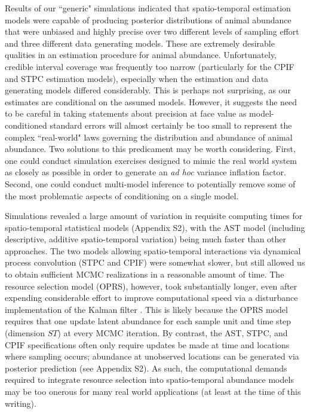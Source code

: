 \documentclass[times,mee,doublespace,]{besauth2}
\begin{document}
Results of our ``generic" simulations indicated that spatio-temporal estimation models were capable of producing posterior distributions of animal abundance that were unbiased and highly precise over two different levels of sampling effort and three different data generating models.  These are extremely desirable qualities in an estimation procedure for animal abundance. Unfortunately, credible interval coverage was frequently too narrow (particularly for the CPIF and STPC estimation models), especially when the estimation and data generating models differed considerably.  This is perhaps not surprising, as our estimates are conditional on the assumed models.  However, it suggests the need to be careful in taking statements about precision at face value as model-conditioned standard errors will almost certainly be too small to represent the complex ``real-world" laws governing the distribution and abundance of animal abundance.  Two solutions to this predicament may be worth considering.  First, one could conduct simulation exercises designed to mimic the real world system as closely as possible in order to generate an {\it ad hoc} variance inflation factor.  Second, one could conduct multi-model inference \citep[e.g. using Bayesian model averaging;][]{HoetingEtAl1999} to potentially remove some of the most problematic aspects of conditioning on a single model.

Simulations revealed a large amount of variation in requisite computing times for spatio-temporal statistical models (Appendix S2), with the AST model (including descriptive, additive spatio-temporal variation) being much faster than other approaches.  The two models allowing spatio-temporal interactions via dynamical process convolution (STPC and CPIF) were somewhat slower, but still allowed us to obtain sufficient MCMC realizations in a reasonable amount of time.  The resource selection model (OPRS), however, took substantially longer, even after expending considerable effort to improve computational speed via a disturbance implementation of the Kalman filter \citep[][see Appendix S2]{DurbinKoopman2002}.  This is likely because the OPRS model requires that one update latent abundance for each sample unit and time step (dimension $ST$) at every MCMC iteration.  By contrast, the AST, STPC, and CPIF specifications often only require updates be made at time and locations where sampling occurs; abundance at unobserved locations can be generated via posterior prediction (see Appendix S2).  As such, the computational demands required to integrate resource selection into spatio-temporal abundance models may be too onerous for many real world applications (at least at the time of this writing).
\end{document}
